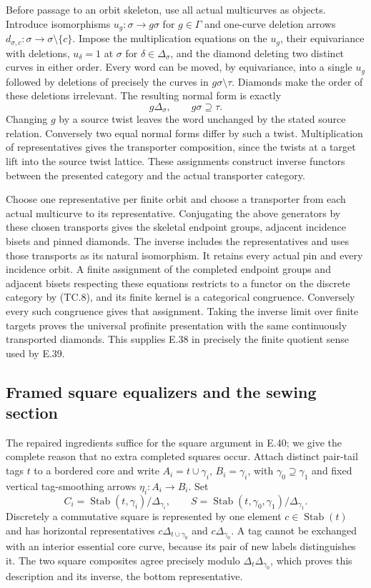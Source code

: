 Before passage to an orbit skeleton, use all actual multicurves as
objects.  Introduce isomorphisms $u_g:\sigma\to g\sigma$ for
$g\in\Gamma$ and one-curve deletion arrows
$d_{\sigma,c}:\sigma\to\sigma\setminus\{c\}$.
Impose the multiplication equations on the $u_g$, their equivariance
with deletions, $u_\delta=1$ at $\sigma$ for $\delta\in\Delta_\sigma$,
and the diamond deleting two distinct curves in either order.
Every word can be moved, by equivariance, into a single $u_g$ followed
by deletions of precisely the curves in $g\sigma\setminus\tau$.
Diamonds make the order of these deletions irrelevant.  The resulting
normal form is exactly
\[
       g\Delta_\sigma,
          \qquad g\sigma\supseteq\tau.                     \tag{TC.8}
\]
Changing $g$ by a source twist leaves the word unchanged by the stated
source relation.  Conversely two equal normal forms differ by such a
twist.  Multiplication of representatives gives the transporter
composition, since the twists at a target lift into the source
twist lattice.  These assignments construct inverse functors between
the presented category and the actual transporter category.

Choose one representative per finite orbit and choose a transporter
from each actual multicurve to its representative.  Conjugating the
above generators by these chosen transports gives the skeletal
endpoint groups, adjacent incidence bisets and pinned diamonds.
The inverse includes the representatives and uses those transports
as its natural isomorphism.  It retains every actual pin and every
incidence orbit.  A finite assignment of the completed endpoint
groups and adjacent bisets respecting these equations restricts to
a functor on the discrete category by (TC.8), and its finite kernel
is a categorical congruence.  Conversely every such congruence gives
that assignment.  Taking the inverse limit over finite targets proves
the universal profinite presentation with the same continuously
transported diamonds.  This supplies E.38 in precisely the finite
quotient sense used by E.39.

\subsection{Framed square equalizers and the sewing section}

The repaired ingredients suffice for the square argument in E.40;
we give the complete reason that no extra completed squares occur.
Attach distinct pair-tail tags $t$ to a bordered core and write
$A_i=t\cup\gamma_i$, $B_i=\gamma_i$, with
$\gamma_0\supseteq\gamma_1$ and fixed vertical tag-smoothing arrows
$\eta_i:A_i\to B_i$.  Set
\[
 C_i=\operatorname{Stab}(t,\gamma_i)/\Delta_{\gamma_i},
 \qquad S=\operatorname{Stab}(t,\gamma_0,\gamma_1)
                                      /\Delta_{\gamma_1}.
\]
Discretely a commutative square is represented by one element
$c\in\operatorname{Stab}(t)$ and has horizontal representatives
$c\Delta_{t\cup\gamma_0}$ and $c\Delta_{\gamma_0}$.
A tag cannot be exchanged with an interior essential core curve,
because its pair of new labels distinguishes it.  The two square
composites agree precisely modulo
$\Delta_t\Delta_{\gamma_0}$, which proves this description and
its inverse, the bottom representative.

